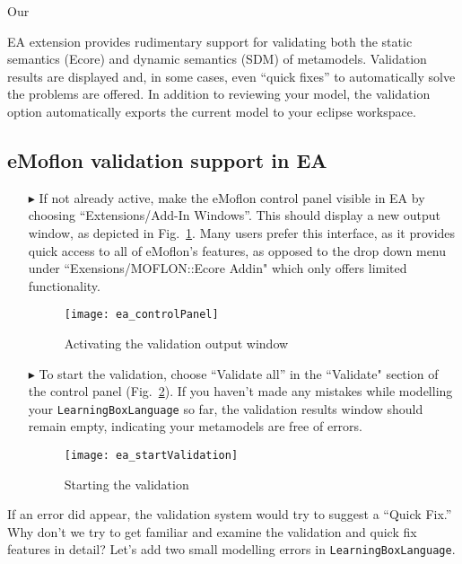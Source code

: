 \visHeader

\hypertarget{validation vis}{Our} EA extension provides rudimentary support for validating both the static semantics (Ecore) and dynamic semantics (SDM) of
metamodels. Validation results are displayed and, in some cases, even ``quick fixes'' to automatically solve the problems are offered. In addition to reviewing
your model, the validation option automatically exports the current model to your eclipse workspace.

\subsection{eMoflon validation support in EA}

\begin{enumerate}
\item[$\blacktriangleright$] If not already active, make the eMoflon control panel visible in EA by choosing ``Extensions/\-Add-In Windows''. This should
display a new output window, as depicted in Fig.~\ref{fig:validation_output}. Many users prefer this interface, as it provides quick access to all of eMoflon's
features, as opposed to the drop down menu under ``Exensions/MOFLON::Ecore Addin" which only offers limited functionality.

\begin{figure}[htbp]
	\centering
  \texttt{[image: ea\_controlPanel]}
	\caption{Activating the validation output window}
	\label{fig:validation_output}
\end{figure}
\FloatBarrier

\clearpage
\item[$\blacktriangleright$] To start the validation, choose ``Validate all'' in the ``Validate" section of the control panel
(Fig.~\ref{fig:validation_menu}). If you haven't made any mistakes while modelling your \texttt{LearningBoxLanguage} so far, the validation results window
should remain empty, indicating your metamodels are free of errors.

\begin{figure}[htbp]
	\centering
  \texttt{[image: ea\_startValidation]}
	\caption{Starting the validation}
	\label{fig:validation_menu}
\end{figure}
\FloatBarrier
\end{enumerate}

If an error did appear, the validation system would try to suggest a ``Quick Fix.'' Why don't we try to get familiar and examine the validation and quick fix
features in detail? Let's add two small modelling errors in \texttt{LearningBoxLanguage}.

